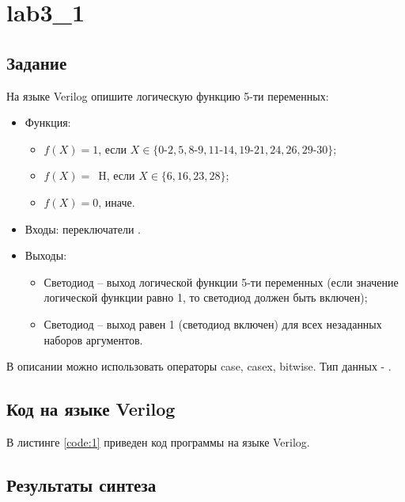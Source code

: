 





\tableofcontents
\listoffigures
\lstlistoflistings
\newpage

\section{lab3\_1}

\subsection{Задание}

На языке Verilog опишите логическую функцию 5-ти переменных:
\begin{itemize}
	\item Функция:
		\begin{itemize}
			\item $f(X) = 1$, если $X \in \{0\text{-}2,5,8\text{-}9,11\text{-}14,19\text{-}21,24,26,29\text{-}30\}$;
			\item $f(X) =$\ H, если $X \in \{6,16,23,28\}$;
			\item $f(X) = 0$, иначе.
		\end{itemize}
	\item Входы: переключатели .
	\item Выходы:
		\begin{itemize}
			\item Светодиод  -- выход логической функции 5-ти переменных (если значение логической функции равно 1, то светодиод должен быть включен);
			\item Светодиод  -- выход равен 1 (светодиод включен) для всех незаданных наборов аргументов.
		\end{itemize}
\end{itemize}

В описании можно использовать операторы case, casex, bitwise. Тип данных - .

\subsection{Код на языке Verilog}

В листинге \ref{code:1} приведен код программы на языке Verilog.



\subsection{Результаты синтеза}

